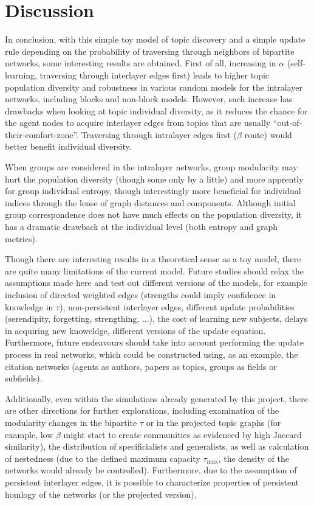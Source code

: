 \section{Discussion}

In conclusion, with this simple toy model of topic discovery and a simple update rule depending on the probability of traversing through neighbors of bipartite networks, some interesting results are obtained. First of all, increasing in $\alpha$ (self-learning, traversing through interlayer edges first) leads to higher topic population diversity and robustness in various random models for the intralayer networks, including blocks and non-block models. However, such increase has drawbacks when looking at topic individual diversity, as it reduces the chance for the agent nodes to acquire interlayer edges from topics that are usually ``out-of-their-comfort-zone''. Traversing through intralayer edges first ($\beta$ route) would better benefit individual diversity.

When groups are considered in the intralayer networks, group modularity may hurt the population diversity (though some only by a little) and more apprently for group individual entropy, though interestingly more beneficial for individual indices through the lense of graph distances and components. Although initial group correspondence does not have much effects on the population diversity, it has a dramatic drawback at  the individual level (both entropy and graph metrics).

Though there are interesting results in a theoretical sense as a toy model, there are quite many limitations of the current model. Future studies should relax the assumptions made here and test out different versions of the models, for example inclusion of directed weighted edges (strengths could imply confidence in knowledge in $\tau$), non-persistent interlayer edges, different update probabilities (serendipity, forgetting, strengthing, ...), the cost of learning new subjects, delays in acquiring new knoweldge, different versions of the update equation. Furthermore, future endeavours should take into account performing the update process in real networks, which could be constructed using, as an example, the citation networks (agents as authors, papers as topics, groups as fields or subfields).

Additionally, even within the simulations already generated by this project, there are other directions for further explorations, including examination of the modularity changes in the bipartite $\tau$ or in the projected topic graphs (for example, low $\beta$ might start to create communities as evidenced by high Jaccard similarity), the distribution of specificialists and generalists, as well as calculation of nestedness (due to the defined maximum capacity $\tau_{\mathrm{max}}$, the density of the networks would already be controlled). Furthermore, due to the assumption of persistent interlayer edges, it is possible to characterize properties of persistent homlogy of the networks (or the projected version).

